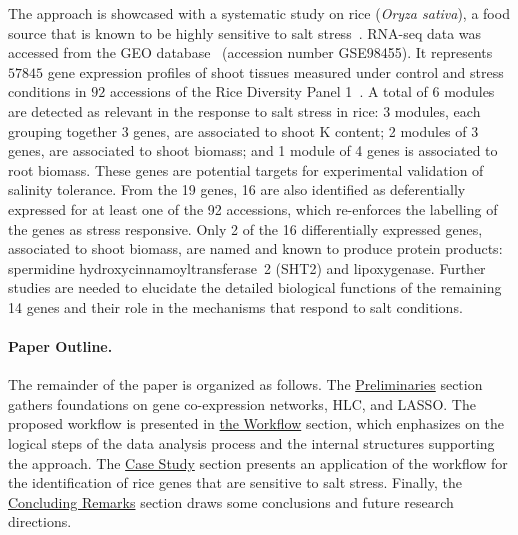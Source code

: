 The approach is showcased with a systematic study on rice
(\textit{Oryza sativa}), a food source that is known to be
highly sensitive to salt stress~\cite{chang2019morphological}. RNA-seq
data was accessed from the GEO database~\cite{clough2016gene}
(accession number GSE98455). It represents $57845$ gene expression
profiles of shoot tissues measured under control and stress conditions
in $92$ accessions of the Rice Diversity Panel 1~\cite{eizenga2014registration}. A total of 6 modules
are detected as relevant in the response to salt stress in rice: 3
modules, each grouping together 3 genes, are associated to shoot K content; 2
modules of 3 genes, are associated to shoot biomass; and 1 module of 4
genes is associated to root biomass. These genes are potential
targets for experimental validation of salinity tolerance. 
From the 19 genes, 16
are also identified as deferentially expressed for at least
one of the 92 accessions, which re-enforces the labelling of the genes as
stress responsive. Only 2 of the 16 differentially
expressed genes, associated to shoot biomass, are
named and known to produce protein products: spermidine
hydroxycinnamoyltransferase~2 (SHT2) and lipoxygenase. 
Further studies are needed to elucidate the detailed biological
functions of the remaining 14 genes and their role
in the mechanisms that respond 
to salt conditions.

\paragraph{Paper Outline.}

The remainder of the paper is organized as
follows. The \hyperref[sec.prelim]{Preliminaries} section gathers foundations on gene
co-expression networks, HLC, and LASSO. The proposed workflow is
presented in \hyperref[sec.framework]{the Workflow} section, which enphasizes on the
logical steps of the data analysis process and the internal structures supporting
the approach. The \hyperref[sec.case]{Case Study} section presents an application of the workflow for the
identification of rice genes that are sensitive to salt
stress. Finally, the \hyperref[sec.concl]{Concluding Remarks} section draws some conclusions and future research directions.